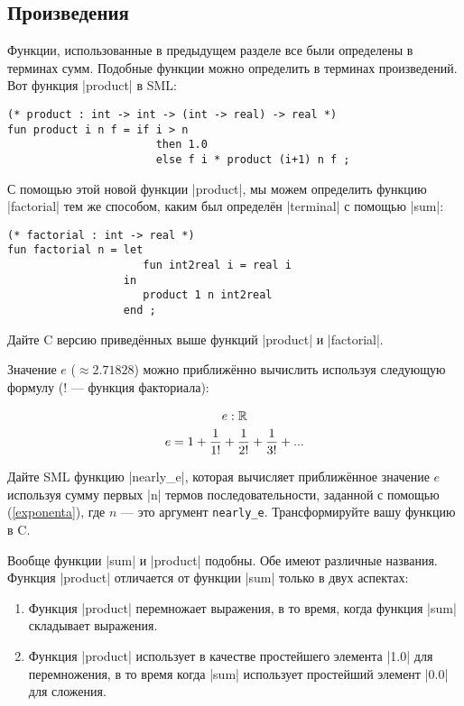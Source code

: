\subsection{Произведения}\label{Products}

Функции, использованные в предыдущем разделе все были определены в терминах сумм. Подобные функции можно определить в терминах произведений. Вот функция \inline|product| в SML:

\begin{lstlisting}[style=customml]
(* product : int -> int -> (int -> real) -> real *)
fun product i n f = if i > n
                       then 1.0
                       else f i * product (i+1) n f ;
\end{lstlisting}

С помощью этой новой функции \inline|product|, мы можем определить функцию \inline|factorial| тем же способом, каким был определён \inline|terminal| с помощью \inline|sum|:

\begin{lstlisting}[style=customml]
(* factorial : int -> real *)
fun factorial n = let
                     fun int2real i = real i
                  in
                     product 1 n int2real
                  end ;
\end{lstlisting}

\exercise Дайте C версию приведённых выше функций \inline|product| и \inline|factorial|.\label{ex_2.12}

\exercise Значение $e$ ($\approx 2.71828$) можно приближённо вычислить используя следующую формулу ($!$ --- функция факториала):

\begin{gather}
  e : \mathbb R \notag \\
  e = 1 + \frac {1} {1!} + \frac {1} {2!} + \frac {1} {3!} + ... \label{exponenta}
\end{gather}

Дайте SML функцию \inline|nearly_e|, которая вычисляет приближённое значение $e$ используя сумму первых \inline|n| термов последовательности, заданной с помощью (\ref{exponenta}), где $n$ --- это аргумент \lstinline|nearly_e|. Трансформируйте вашу функцию в C.

Вообще функции \inline|sum| и \inline|product| подобны. Обе имеют различные названия. Функция \inline|product| отличается от функции \inline|sum| только в двух аспектах:

\begin{enumerate}
\item{Функция \inline|product| перемножает выражения, в то время, когда функция \inline|sum| складывает выражения.}

\item{Функция \inline|product| использует в качестве простейшего элемента \inline|1.0| для перемножения, в то время когда \inline|sum| использует простейший элемент \inline|0.0| для сложения.}
\end{enumerate}

